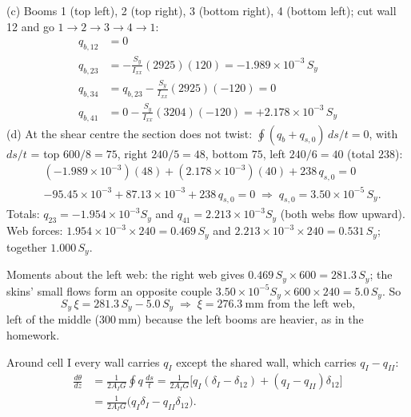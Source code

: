 \documentclass[11pt]{article}
\newcommand{\mm}{\ \mathrm{mm}}
\begin{document}
(c) Booms 1 (top left), 2 (top right), 3 (bottom right), 4 (bottom left); cut wall 12 and go $1\to2\to3\to4\to1$:
\begin{align*}
q_{b,12} &= 0\\
q_{b,23} &= -\frac{S_y}{I_{xx}}(2925)(120) = -1.989\times10^{-3}\,S_y\\
q_{b,34} &= q_{b,23} - \frac{S_y}{I_{xx}}(2925)(-120) = 0\\
q_{b,41} &= 0 - \frac{S_y}{I_{xx}}(3204)(-120) = +2.178\times10^{-3}\,S_y
\end{align*}
(d) At the shear centre the section does not twist: $\oint (q_b + q_{s,0})\,ds/t = 0$, with $ds/t$ = top
$600/8 = 75$, right $240/5 = 48$, bottom $75$, left $240/6 = 40$ (total $238$):
\begin{align*}
&(-1.989\times10^{-3})(48) + (2.178\times10^{-3})(40) + 238\,q_{s,0} = 0\\
&-95.45\times10^{-3} + 87.13\times10^{-3} + 238\,q_{s,0} = 0
\;\Rightarrow\; q_{s,0} = 3.50\times10^{-5}\,S_y .
\end{align*}
Totals: $q_{23} = -1.954\times10^{-3}S_y$ and $q_{41} = 2.213\times10^{-3}S_y$ (both webs flow upward). Web forces:
$1.954\times10^{-3}\times240 = 0.469\,S_y$ and $2.213\times10^{-3}\times240 = 0.531\,S_y$; together $1.000\,S_y$. \checkmark

Moments about the left web: the right web gives $0.469\,S_y\times600 = 281.3\,S_y$; the skins' small flows form an
opposite couple $3.50\times10^{-5}S_y\times600\times240 = 5.0\,S_y$. So
\[ S_y\,\xi = 281.3\,S_y - 5.0\,S_y \;\Rightarrow\; \xi = 276.3\mm \text{ from the left web,} \]
left of the middle ($300\mm$) because the left booms are heavier, as in the homework.

Around cell I every wall carries $q_I$ except the shared wall, which carries $q_I - q_{II}$:
\begin{align*}
\frac{d\theta}{dz} &= \frac{1}{2A_IG}\oint q\,\frac{ds}{t}
= \frac{1}{2A_IG}\Big[q_I(\delta_I - \delta_{12}) + (q_I - q_{II})\delta_{12}\Big]\\
&= \frac{1}{2A_IG}\big(q_I\delta_I - q_{II}\delta_{12}\big).
\end{align*}
\end{document}
